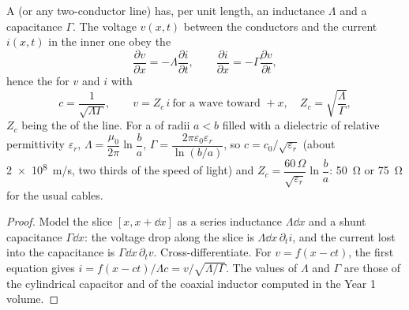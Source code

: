 \begin{proposition}\label{prop:b2:dispersion-wave-packets:coax}
A  (or any two-conductor line) has, per unit length, an
inductance $\Lambda$ and a capacitance $\Gamma$. The voltage $v(x, t)$ between
the conductors and the current $i(x, t)$ in the inner one obey the
\emph{}
\[
\frac{\partial v}{\partial x} = -\Lambda\frac{\partial i}{\partial t} , \qquad
\frac{\partial i}{\partial x} = -\Gamma\frac{\partial v}{\partial t} ,
\]
hence the  for $v$ and $i$ with
\[
c = \frac1{\sqrt{\Lambda\Gamma}} , \qquad
v = Z_c\,i \ \text{for a wave toward } +x, \quad Z_c = \sqrt{\frac\Lambda\Gamma} ,
\]
$Z_c$ being the \emph{} of the line. For a
 of radii $a < b$ filled with a dielectric of relative
permittivity $\varepsilon_r$, $\Lambda = \dfrac{\mu_0}{2\pi}\ln\dfrac ba$, $\Gamma =
\dfrac{2\pi\varepsilon_0\varepsilon_r}{\ln(b/a)}$, so $c = c_0/\sqrt{\varepsilon_r}$ (about
\qty{2e8}{m/s}, two thirds of the speed of light) and $Z_c = \dfrac{60\,\Omega}
{\sqrt{\varepsilon_r}}\ln\dfrac ba$: \qty{50}{\ohm} or \qty{75}{\ohm} for the usual cables.
\end{proposition}

\begin{proof}
Model the slice $[x, x + \dd x]$ as a series inductance $\Lambda\dd x$ and a
shunt capacitance $\Gamma\dd x$: the voltage drop along the slice is
$\Lambda\dd x\,\partial_ti$, and the current lost into the capacitance is $\Gamma\dd x
\,\partial_tv$. Cross-differentiate. For $v = f(x - ct)$, the first equation
gives $i = f(x - ct)/\Lambda c = v/\sqrt{\Lambda/\Gamma}$. The values of $\Lambda$ and
$\Gamma$ are those of the cylindrical capacitor and of the coaxial
inductor computed in the Year 1 volume.
\end{proof}

